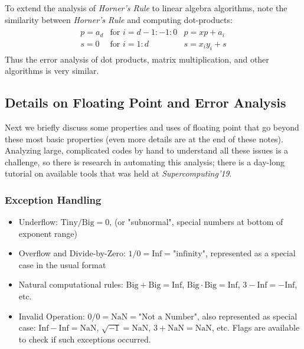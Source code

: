 \documentclass[11pt]{article}
\numberwithin{equation}{section}
\begin{document}
To extend the analysis of \textit{Horner's Rule} to linear algebra algorithms, note the similarity between \textit{Horner's Rule} and computing dot-products: \begin{align*}
    \begin{array}{lll}
        p=a_d & \text{for } i = d-1:-1:0 & p=xp + a_i \\
        s=0 & \text{for } i = 1:d & s=x_i y_i + s
    \end{array}
\end{align*}
Thus the error analysis of dot products, matrix multiplication, and other algorithms is very similar.

\subsection{Details on Floating Point and Error Analysis}
Next we briefly discuss some properties and uses of floating point that go beyond these most basic properties (even more details are at the end of these notes). 
Analyzing large, complicated codes by hand to understand all these issues is a challenge, so there is research in automating this analysis; 
there is a day-long tutorial on available tools that was held at \textit{Supercomputing'19}.

\subsubsection{Exception Handling}
\begin{itemize}
    \item Underflow: $\mathrm{Tiny} / \mathrm{Big} = 0$,  (or "subnormal", special numbers at bottom of exponent range)
    \item Overflow and Divide-by-Zero:  $1/0 = \mathrm{Inf} = \text{"infinity"}$, represented as a special case in the usual format
    \item Natural computational rules: $\mathrm{Big} + \mathrm{Big} = \mathrm{Inf}$, $\mathrm{Big} \cdot \mathrm{Big} = \mathrm{Inf}$, $3 - \mathrm{Inf} = -\mathrm{Inf}$, etc.
    \item Invalid Operation: $0/0 = \mathrm{NaN} = \text{"Not a Number"}$, also represented as special case: $\mathrm{Inf} - \mathrm{Inf} = \mathrm{NaN}$,
    $\sqrt{-1} = \mathrm{NaN}$, $3 + \mathrm{NaN} = \mathrm{NaN}$, etc. Flags are available to check if such exceptions occurred.
\end{itemize}
\end{document}
